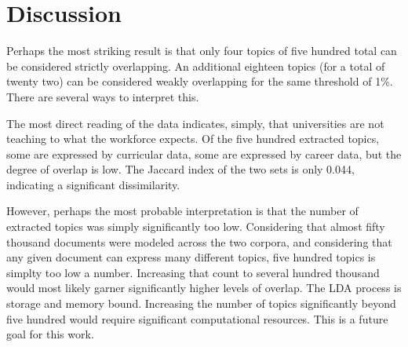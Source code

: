 \section{Discussion}

Perhaps the most striking result is that only four topics of five hundred total can be considered strictly overlapping.
An additional eighteen topics (for a total of twenty two) can be considered weakly overlapping for the same threshold of 1\%.
There are several ways to interpret this.

The most direct reading of the data indicates, simply, that universities are not teaching to what the workforce expects.
Of the five hundred extracted topics, some are expressed by curricular data, some are expressed by career data, but the degree of overlap is low.
The Jaccard index of the two sets is only 0.044, indicating a significant dissimilarity.

However, perhaps the most probable interpretation is that the number of extracted topics was simply significantly too low.
Considering that almost fifty thousand documents were modeled across the two corpora, and considering that any given document can express many different topics, five hundred topics is simplty too low a number.
Increasing that count to several hundred thousand would most likely garner significantly higher levels of overlap.
The LDA process is storage and memory bound.
Increasing the number of topics significantly beyond five hundred would require significant computational resources.
This is a future goal for this work.
